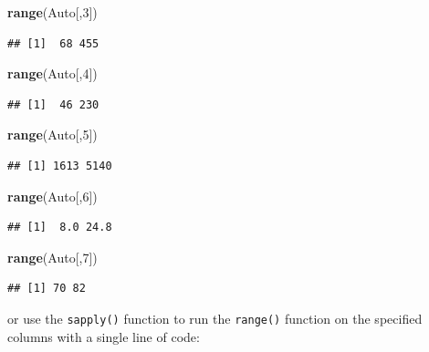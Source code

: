 \documentclass[]{article}
\newenvironment{Shaded}{\begin{snugshade}}{\end{snugshade}}
\newcommand{\KeywordTok}[1]{\textcolor[rgb]{0.13,0.29,0.53}{\textbf{#1}}}
\newcommand{\DecValTok}[1]{\textcolor[rgb]{0.00,0.00,0.81}{#1}}
\newcommand{\NormalTok}[1]{#1}
\begin{document}
\begin{Shaded}
\begin{Highlighting}[]
\KeywordTok{range}\NormalTok{(Auto[,}\DecValTok{3}\NormalTok{])}
\end{Highlighting}
\end{Shaded}

\begin{verbatim}
## [1]  68 455
\end{verbatim}

\begin{Shaded}
\begin{Highlighting}[]
\KeywordTok{range}\NormalTok{(Auto[,}\DecValTok{4}\NormalTok{])}
\end{Highlighting}
\end{Shaded}

\begin{verbatim}
## [1]  46 230
\end{verbatim}

\begin{Shaded}
\begin{Highlighting}[]
\KeywordTok{range}\NormalTok{(Auto[,}\DecValTok{5}\NormalTok{])}
\end{Highlighting}
\end{Shaded}

\begin{verbatim}
## [1] 1613 5140
\end{verbatim}

\begin{Shaded}
\begin{Highlighting}[]
\KeywordTok{range}\NormalTok{(Auto[,}\DecValTok{6}\NormalTok{])}
\end{Highlighting}
\end{Shaded}

\begin{verbatim}
## [1]  8.0 24.8
\end{verbatim}

\begin{Shaded}
\begin{Highlighting}[]
\KeywordTok{range}\NormalTok{(Auto[,}\DecValTok{7}\NormalTok{])}
\end{Highlighting}
\end{Shaded}

\begin{verbatim}
## [1] 70 82
\end{verbatim}

or use the \texttt{sapply()} function to run the \texttt{range()}
function on the specified columns with a single line of code:
\end{document}
